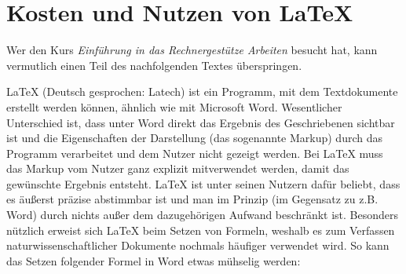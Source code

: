 \section{Kosten und Nutzen von LaTeX}
Wer den Kurs \textit{Einführung in das Rechnergestütze Arbeiten} besucht hat, kann vermutlich einen Teil des nachfolgenden Textes überspringen.

LaTeX (Deutsch gesprochen: \glqq Latech\grqq) ist ein Programm, mit dem Textdokumente erstellt werden können, ähnlich wie mit Microsoft Word. Wesentlicher Unterschied ist, dass unter Word direkt das Ergebnis des Geschriebenen sichtbar ist und die Eigenschaften der Darstellung (das sogenannte Markup) durch das Programm verarbeitet und dem Nutzer nicht gezeigt werden. Bei LaTeX muss das Markup vom Nutzer ganz explizit mitverwendet werden, damit das gewünschte Ergebnis entsteht. LaTeX ist unter seinen Nutzern dafür beliebt, dass es äußerst präzise abstimmbar ist und man im Prinzip (im Gegensatz zu z.B. Word) durch nichts außer dem dazugehörigen Aufwand beschränkt ist.
Besonders nützlich erweist sich LaTeX beim Setzen von Formeln, weshalb es zum Verfassen naturwissenschaftlicher Dokumente nochmals häufiger verwendet wird. So kann das Setzen folgender Formel in Word etwas mühselig werden:

